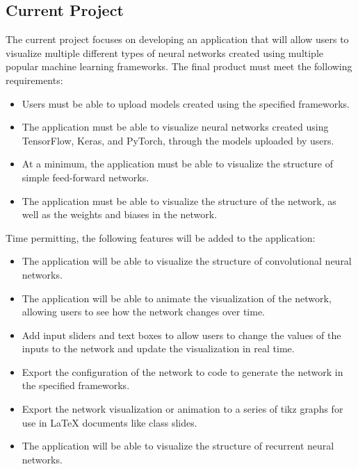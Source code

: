 \documentclass[letterpaper, 12pt]{report}
\begin{document}
\subsection*{Current Project}
The current project focuses on developing an application that will allow users to visualize multiple different types of neural networks created using multiple popular machine learning frameworks. The final product must meet the following requirements:
\begin{itemize}
    \item Users must be able to upload models created using the specified frameworks.
    \item The application must be able to visualize neural networks created using TensorFlow, Keras, and PyTorch, through the models uploaded by users.
    \item At a minimum, the application must be able to visualize the structure of simple feed-forward networks.
    \item The application must be able to visualize the structure of the network, as well as the weights and biases in the network.
\end{itemize}
Time permitting, the following features will be added to the application:
\begin{itemize}
    \item The application will be able to visualize the structure of convolutional neural networks.
    \item The application will be able to animate the visualization of the network, allowing users to see how the network changes over time.
    \item Add input sliders and text boxes to allow users to change the values of the inputs to the network and update the visualization in real time.
    \item Export the configuration of the network to code to generate the network in the specified frameworks.
    \item Export the network visualization or animation to a series of tikz graphs for use in LaTeX documents like class slides.
    \item The application will be able to visualize the structure of recurrent neural networks.
\end{itemize}
\end{document}

